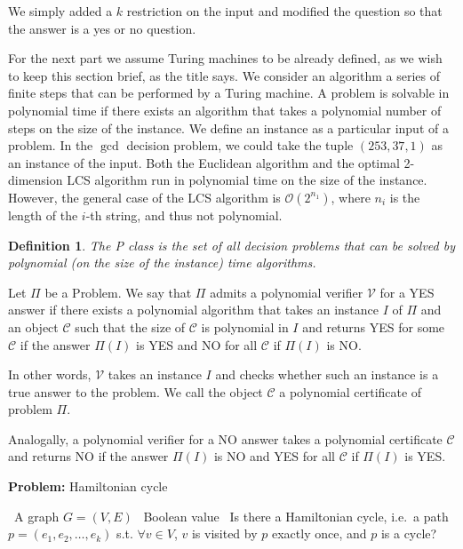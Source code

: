 \documentclass{amsart}
\theoremstyle{plain}
\newcounter{dummy-def}\numberwithin{dummy-def}{section}
\newtheorem{definition}[dummy-def]{Definition}
\newcounter{dummy-prop}\numberwithin{dummy-prop}{section}
\newcounter{dummy-corollary}\numberwithin{dummy-corollary}{section}
\newcounter{dummy-ex}\numberwithin{dummy-ex}{section}
\newcounter{dummy-eg}\numberwithin{dummy-eg}{section}
\newcommand{\bigo}{\mathcal{O}}
\newcommand{\verifier}{\mathcal{V}}
\begin{document}
We simply added a $k$ restriction on the input and modified the question so that the answer is a
yes or no question.

For the next part we assume Turing machines to be already defined, as we wish to keep this section
brief, as the title says. We consider an algorithm a series of finite steps that can be performed
by a Turing machine. A problem is solvable in polynomial time if there exists an algorithm that
takes a polynomial number of steps on the size of the instance. We define an instance as a
particular input of a problem. In the $\gcd$ decision problem, we could take the tuple $(253, 37,
1)$ as an instance of the input. Both the Euclidean algorithm and the optimal 2-dimension LCS
algorithm run in polynomial time on the size of the instance. However, the general case of the LCS
algorithm is $\bigo(2^{n_1})$, where $n_i$ is the length of the $i$-th string, and thus not
polynomial.

\begin{definition} The P class is the set of all decision problems that can be solved by polynomial
  (on the size of the instance) time algorithms.
\end{definition}

Let $\Pi$ be a Problem. We say that $\Pi$ admits a polynomial verifier $\verifier$ for a YES answer
if there exists a polynomial algorithm that takes an instance $I$ of $\Pi$ and an object
$\mathcal{C}$ such that the size of $\mathcal{C}$ is polynomial in $I$ and returns YES for some
$\mathcal{C}$ if the answer $\Pi(I)$ is YES and NO for all $\mathcal{C}$ if $\Pi(I)$ is NO\@.

In other words, $\verifier$ takes an instance $I$ and checks whether such an instance is a true
answer to the problem. We call the object $\mathcal{C}$ a polynomial certificate of problem $\Pi$.

Analogally, a polynomial verifier for a NO answer takes a polynomial certificate $\mathcal{C}$ and
returns NO if the answer $\Pi(I)$ is NO and YES for all $\mathcal{C}$ if $\Pi(I)$ is YES\@.

\begin{algorithm}[h]
  \caption*{\textbf{Problem:} Hamiltonian cycle}
  \begin{algorithmic}[1]
    \Require\, A graph $G=(V, E)$
    \Ensure\, Boolean value
    \Description\, Is there a Hamiltonian cycle, i.e.\ a path $p=(e_1,e_2,\ldots,e_k)$ s.t. $\forall v
    \in V$, $v$ is visited by $p$ exactly once, and $p$ is a cycle?
  \end{algorithmic}
\end{algorithm}
\end{document}
